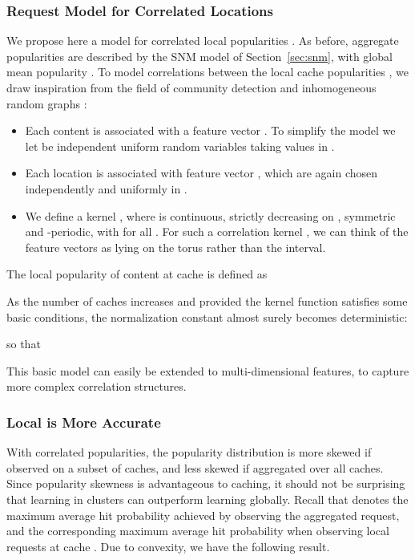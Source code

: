 \documentclass[10pt, conference, letterpaper]{IEEEtran}
\begin{document}
\subsubsection{Request Model for Correlated Locations}

We propose here a model for correlated local popularities . 
As before, aggregate popularities  are described by the SNM model of Section~\ref{sec:snm}, with global mean popularity .
To model correlations between the local cache popularities , we draw inspiration from the field of community detection \cite{lelarge2013reconstruction} and inhomogeneous random graphs \cite{bollobas2007phase}:
\begin{itemize}
\item Each content  is associated with a feature vector . To simplify the model we let  be independent uniform random variables taking values in . 

\item Each location  is associated with feature vector , which are again chosen independently and uniformly in .

\item We define a kernel , where  is continuous, strictly decreasing on , symmetric and -periodic, with  for all . For such a correlation kernel , we can think of the feature vectors  as lying on the torus  rather than the interval.
\end{itemize}
The local popularity of content  at cache  is defined as 

As the number of caches  increases and provided the kernel function  satisfies some basic conditions, the normalization constant almost surely becomes deterministic: 
 
so that 

















This basic model can easily be extended to multi-dimensional features, to capture more complex correlation structures.

\subsubsection{Local is More Accurate}
With correlated popularities, the popularity distribution is more skewed if observed on a subset of caches, and less skewed if aggregated over all caches. Since popularity skewness is advantageous to caching, it should not be surprising that learning in clusters can outperform learning globally.
Recall that 
 denotes the maximum average hit probability achieved by observing the aggregated request, and  the corresponding maximum average hit probability when observing local requests at cache . 
Due to convexity, we have the following result.
\end{document}
